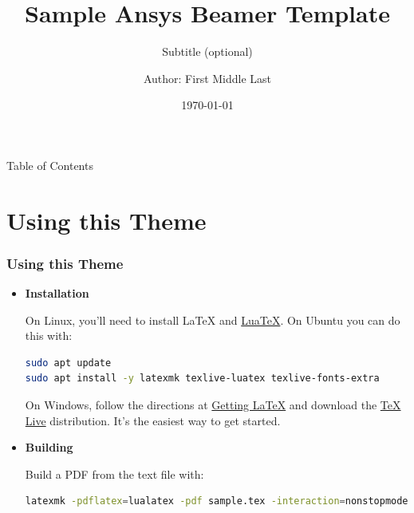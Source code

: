\documentclass[t]{beamer}
\begin{document}

\title{Sample Ansys Beamer Template}
\subtitle{Subtitle (optional)}
\author{Author: First Middle Last}
\date{\today}

\titleframe{}



\begin{frame}{Table of Contents}
  \tableofcontents
  \vspace{200pt}  %
\end{frame}


\section{Using this Theme}
\begin{frame}[fragile=singleslide]
  \frametitle{Using this Theme}

  \begin{itemize}

  \item{\textbf{Installation}
    
    On Linux, you'll need to install LaTeX and
    \href{https://www.luatex.org/}{LuaTeX}. On Ubuntu you can do this with:

    \begin{lstlisting}[language=bash,basicstyle=\footnotesize\ttfamily]
sudo apt update
sudo apt install -y latexmk texlive-luatex texlive-fonts-extra
    \end{lstlisting}


    On Windows, follow the directions at
    \href{https://www.latex-project.org/get/}{Getting LaTeX} and download the
    \href{HTTP://www.tug.org/texlive}{TeX Live} distribution. It's the easiest
    way to get started.
  }

  \item{\textbf{Building}

    Build a PDF from the text file with:

    \begin{lstlisting}[language=bash,basicstyle=\footnotesize\ttfamily]
latexmk -pdflatex=lualatex -pdf sample.tex -interaction=nonstopmode -outdir=./build
    \end{lstlisting}

    }

  \end{itemize}

\end{frame}
\end{document}

